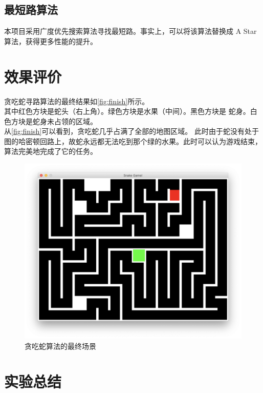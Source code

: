 \documentclass[a4paper]{article}
\begin{document}
\subsection{最短路算法}
本项目采用广度优先搜索算法寻找最短路。事实上，可以将该算法替换成
A Star算法，获得更多性能的提升。

\section{效果评价}\label{sec:eval}
贪吃蛇寻路算法的最终结果如\autoref{fig:finish}所示。\\

其中红色方块是蛇头（右上角）。绿色方块是水果（中间）。黑色方块是
蛇身。白色方块是蛇身未占领的区域。\\

从\autoref{fig:finish}可以看到，贪吃蛇几乎占满了全部的地图区域。
此时由于蛇没有处于图的哈密顿回路上，故蛇永远都无法吃到那个绿的水果。此时可以认为游戏结束，
算法完美地完成了它的任务。
\begin{figure}[!hbt]
    \begin{center}
    \includegraphics[scale=0.4]{assets/finish.png}
    \caption{贪吃蛇算法的最终场景\label{fig:finish}} 
    \end{center} 
\end{figure} 

\section{实验总结}

\end{document}
